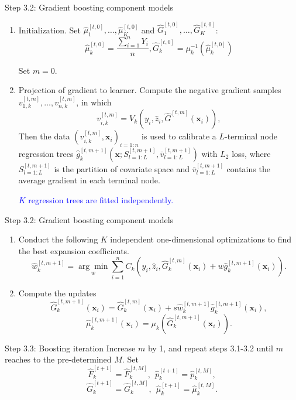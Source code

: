 \documentclass[professionalfont]{beamer}
\newcounter{saveenumi}
\newcommand{\seti}{\setcounter{saveenumi}{\value{enumi}}}
\newcommand{\conti}{\setcounter{enumi}{\value{saveenumi}}}
\def\bx{\boldsymbol{x}}
\newcommand{\blue}[1]{\textcolor{blue}{#1}}
\begin{document}
\begin{frame}{Step 3.2: Gradient boosting component models}
		\begin{enumerate}
		\item Initialization. Set $\hat{\mu}_1^{[t,0]},\ldots,\hat{\mu}_K^{[t,0]}$ and $\hat{G}_1^{[t,0]},\ldots,\hat{G}_K^{[t,0]}$:
		$$\hat{\mu}_k^{[t,0]}=\frac{\sum_{i=1}^nY_i}{n}, \hat{G}_k^{[t,0]}=\mu_k^{-1}(\hat{\mu}_k^{[t,0]})$$
		
	Set $m=0$.
		\item Projection of gradient to learner. 
		Compute the negative gradient samples $v_{1,k}^{[t,m]},\ldots,v_{n,k}^{[t,m]}$, in which 
		$$v_{i,k}^{[t,m]}=V_k(y_i,\hat{z}_{i},\hat{G}^{[t,m]}(\bx_i)),$$
		Then the data $(v_{i,k}^{[t,m]},\bx_i)_{i=1:n}$ is used to calibrate a $L$-terminal node regression trees $\hat{g}_k^{[t,m+1]}\left(\bx;S^{[t,m+1]}_{l=1:L},\bar{v}^{[t,m+1]}_{l=1:L}\right)$ with $L_2$ loss, where $S^{[t,m+1]}_{l=1:L}$ is the partition of covariate space and $\bar{v}^{[t,m+1]}_{l=1:L}$ contains the average gradient in each terminal node.
		
				\blue{$K$ regression trees are fitted independently.}
		\seti
	\end{enumerate}
\end{frame}

\begin{frame}{Step 3.2: Gradient boosting component models}
	\begin{enumerate}
		\conti
		\item  Conduct the following $K$ independent one-dimensional optimizations to find the best expansion coefficients.
			$$\hat{w}_{k}^{[t,m+1]}=\underset{w}{\arg\min}\sum_{i=1}^n C_{k}(y_i,\hat{z}_i,\hat{G}_k^{[t,m]}(\bx_i)+w\hat{g}_k^{[t,m+1]}(\bx_i)).$$
		
		\item  Compute the updates
		$$\hat{G}_k^{[t,m+1]}(\bx_i)=\hat{G}_k^{[t,m]}(\bx_i)+s\hat{w}_{k}^{[t,m+1]}\hat{g}_{k}^{[t,m+1]}(\bx_i),$$
		$$\hat{\mu}_k^{[t,m+1]}(\bx_i)=\mu_k(\hat{G}_k^{[t,m+1]}(\bx_i)).$$ 

	\end{enumerate}
\end{frame}

\begin{frame}{Step 3.3: Boosting iteration}
	Increase $m$ by 1, and repeat steps 3.1-3.2 until $m$ reaches to the pre-determined $M$.
	Set $$\hat{F}_k^{[t+1]}=\hat{F}_k^{[t,M]},~~\hat{p}_k^{[t+1]}=\hat{p}_k^{[t,M]},$$
	$$\hat{G}_k^{[t+1]}=\hat{G}_k^{[t,M]},~~\hat{\mu}_k^{[t+1]}=\hat{\mu}_k^{[t,M]}.$$ 
\end{frame}
\end{document}
